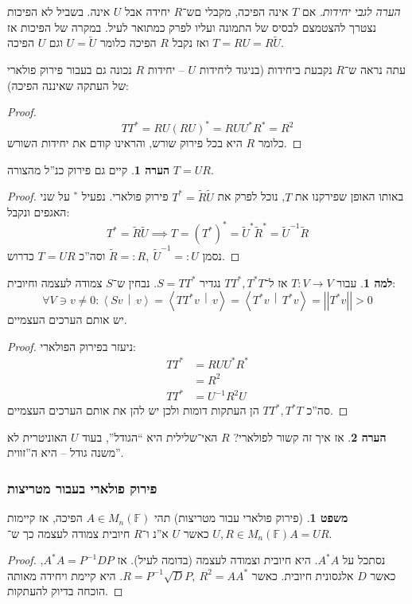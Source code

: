 \documentclass[a4paper]{article}
\newcommand\ra    {\rangle}
\newcommand\la    {\langle}
\newcommand\F         {\mathbb{F}}
\newcommand\co        {\colon}
\newcommand\norm[1]   {\left \vert \left \vert #1 \right \vert \right \vert}
\newcommand\mut [2]   {\left \la #1 \,\middle\vert\, #2 \right \ra}
\newcommand\tl    {\tilde}
\newcommand\op    {^{-1}}
\theoremstyle{definition}
\newtheorem{Theorem}{משפט}
\newtheorem{Lemma}{למה}
\newtheorem{Remark}{הערה}
\newcommand\theo  [1] {\begin{Theorem}#1\end{Theorem}}
\newcommand\rmark [1] {\begin{Remark}#1\end{Remark}}
\newcommand\lem   [1] {\begin{Lemma}#1\end{Lemma}}
\begin{document}
	\textit{הערה לגבי יחידות. }אם $T$ אינה הפיכה, מקבלי םש־$R$ יחידה אבל $U$ אינה. בשביל לא הפיכות נצטרך להצטמצם לבסיס של התמונה ועליו לפרק כמתואר לעיל. במקרה של הפיכות אז $T = RU = R \tl U$ ואז נקבל $R$ הפיכה כלומר $U = \tl U$ וגם $U$ הפיכה. 
	
	עתה נראה ש־$R$ נקבעת ביחידות (בניגוד ליחידות $U$ – יחידות $R$ נכונה גם בעבור פירוק פולארי של העתקה שאיננה הפיכה): 
	\begin{proof}
		\[ TT^* = RU(RU)^* = RUU^*R^* = R^2 \]
		כלומר $R$ היא בכל פירוק שורש, והראינו קודם את יחידות השורש. 
	\end{proof}
	\rmark{קיים גם פירוק כנ''ל מהצורה $T = UR$. }
	\begin{proof}
		באותו האופן שפירקנו את $T$, נוכל לפרק את $T^* = \tl R \tl U$ פירוק פולארי. נפעיל $^*$ על שני האגפים ונקבל: 
		\[ T^* =\tl R \tl U \implies T = (T^*)^* = \tl U^*\tl R^* = \tl U\op \tl R \]
		נסמן $\tl R =: R, \ \tl U\op =: U$ וסה''כ $T = UR$ כדרוש. 
	\end{proof}
	\lem{עבור $T \co V \to V$ אז ל־$TT^*, T^*T$
		נגדיר $S = TT^*$. נבחין ש־$S$ צמודה לעצמה וחיובית: 
		\[ \forall V \ni v \neq 0 \co \mut{Sv}{v} = \mut{TT^* v}{v} = \mut{T^* v}{T^*v} = \norm{T^*v} > 0 \] יש אותם הערכים העצמיים. }
	\begin{proof}ניעזר בפירוק הפולארי: 
		\begin{align*}
			TT^* &= RUU^*R^* \\
			&= R^2 \\
			TT^* &= U\op R^2U
		\end{align*}
		סה''כ $TT^*, T^*T$ הן העתקות דומות ולכן יש להן את אותם הערכים העצמיים. 
	\end{proof}
	
	\rmark{אז איך זה קשור לפולארי? $R$ האי־שלילית היא ``הגודל'', בעוד $U$ האוניטרית לא משנה גודל – היא ה''זווית''. }
	
	
	\subsubsection{פירוק פולארי בעבור מטריצות}
	\theo{(פירוק פולארי עבור מטריצות) תהי $A \in M_n(\F)$ הפיכה, אז קיימות $U, R \in M_n(\F)$ כאשר $U$ א''נ ו־$R$ חיובית צמודה לעצמה כך ש־$A = UR$. }\begin{proof}
		נסתכל על $A^*A$. היא חיובית וצמודה לעצמה (בדומה לעיל). אז $A^*A = P\op D P$, כאשר $D$ אלגסונית חיובית. כאשר $R = P\op \sqrt D P, \ R^2 = AA^*$. היא קיימת ויחידה מאותה הוכחה בדיוק להעתקות. 
	\end{proof}
	
\end{document}
